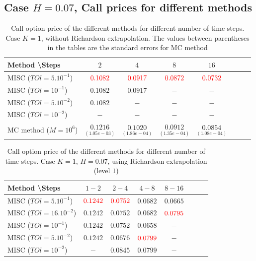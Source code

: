 \documentclass[11pt]{article}
\begin{document}
\newpage
\subsection{Case $H=0.07$, Call prices for different methods}\label{appendix:Case $H=0.07$, Call prices for different methods}

\begin{table}[h!]
	\centering
	\begin{tabular}{l*{6}{c}r}
		Method \textbackslash  Steps            & $2$ & $4$ & $8$ & $16$  \\
		\hline
		MISC ($TOl=5.10^{-1}$)  & ${\color{red}0.1082}$ & ${\color{red}0.0917}$ & ${\color{red}0.0872}$ & ${\color{red}0.0732}$  \\
		MISC ($TOl=10^{-1}$)  & $0.1082$ &  $0.0917$ & $-$ & $-$  \\
		MISC ($TOl=5.10^{-2}$)        & $0.1082$ &$-$ &  $-$ &  $-$ \\
		MISC ($TOl=10^{-2}$)    & $-$ & $-$  & $-$ & $-$  \\
		MC method ($M=10^{6}$)   & $\underset{(1.05e-03)}{0.1216} $  & $\underset{(1.86e-04)}{0.1020} $  & $\underset{ (1.35e-04)}{0.0912}$ & $\underset {(1.08e-04)}{0.0854} $  \\		
		\hline
	\end{tabular}
	\caption{ Call option price of the different methods for different number of time steps. Case $K=1$, without Richardson extrapolation.  The values between parentheses in the tables are the standard errors for MC method}
	\label{table: Call option price of the different methods for different number of time steps. Case $K=1$, $H_007$}
\end{table}

\begin{table}[h!]
	\centering
	\begin{tabular}{l*{6}{c}r}
		Method \textbackslash  Steps    &$1-2$         & $2-4$ & $4-8$ & $8-16$\\
		\hline
		MISC ($TOl=5.10^{-1}$)  &${\color{red}0.1242}$ & ${\color{red}0.0752}$ & $0.0682$ & $0.0665$ \\
		MISC ($TOl=16.10^{-2}$)  &$0.1242$ & $0.0752$ & $0.0682$ & ${\color{red}0.0795}$  \\
		MISC ($TOl=10^{-1}$)  &$0.1242$ & $0.0752$ & $0.0658$ & $-$  \\
		MISC ($TOl=5.10^{-2}$)   &$0.1242$ & $0.0676$ & ${\color{red}0.0799}$ & $-$   \\
		MISC ($TOl=10^{-2}$)  &$-$ & $0.0845$ & $0.0799$ & $-$  \\	
		\hline
	\end{tabular}
	\caption{ Call option price of the different methods for different number of time steps. Case $K=1$, $H=0.07$, using Richardson extrapolation (level $1$)}
	\label{table: Call option price of the different methods for different number of time steps. Case $K=1$, $H=0.07$, using Richardson extrapolation}
\end{table}
\end{document}
